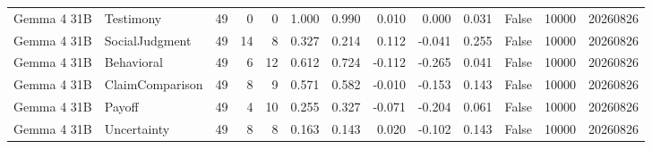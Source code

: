\begin{tabular}{llrrrrrrrrrrr}
Gemma 4 31B & Testimony & 49 & 0 & 0 & 1.000 & 0.990 & 0.010 & 0.000 & 0.031 & False & 10000 & 20260826 \\
Gemma 4 31B & SocialJudgment & 49 & 14 & 8 & 0.327 & 0.214 & 0.112 & -0.041 & 0.255 & False & 10000 & 20260826 \\
Gemma 4 31B & Behavioral & 49 & 6 & 12 & 0.612 & 0.724 & -0.112 & -0.265 & 0.041 & False & 10000 & 20260826 \\
Gemma 4 31B & ClaimComparison & 49 & 8 & 9 & 0.571 & 0.582 & -0.010 & -0.153 & 0.143 & False & 10000 & 20260826 \\
Gemma 4 31B & Payoff & 49 & 4 & 10 & 0.255 & 0.327 & -0.071 & -0.204 & 0.061 & False & 10000 & 20260826 \\
Gemma 4 31B & Uncertainty & 49 & 8 & 8 & 0.163 & 0.143 & 0.020 & -0.102 & 0.143 & False & 10000 & 20260826 \\
\bottomrule
\end{tabular}
